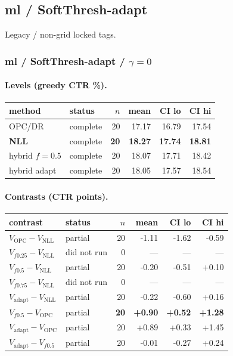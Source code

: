 \documentclass[10pt,a4paper]{article}
\begin{document}
\subsection{ml / SoftThresh-adapt}
Legacy / non-grid locked tags.
\subsubsection{ml / SoftThresh-adapt / $\gamma=0$}
\paragraph{Levels (greedy CTR \%).}
{\centering\small\begin{tabular}{llrrrr}
\toprule method & status & $n$ & mean & CI lo & CI hi \\
\midrule
OPC/DR & complete & 20 & 17.17 & 16.79 & 17.54 \\
\textbf{NLL} & complete & \textbf{20} & \textbf{18.27} & \textbf{17.74} & \textbf{18.81} \\
hybrid $f{=}0.5$ & complete & 20 & 18.07 & 17.71 & 18.42 \\
hybrid adapt & complete & 20 & 18.05 & 17.57 & 18.54 \\
\bottomrule\end{tabular}\par}
\paragraph{Contrasts (CTR points).}
{\centering\small\begin{tabular}{llrrrr}
\toprule contrast & status & $n$ & mean & CI lo & CI hi \\
\midrule
$V_{\mathrm{OPC}}-V_{\mathrm{NLL}}$ & partial & 20 & -1.11 & -1.62 & -0.59 \\
$V_{f0.25}-V_{\mathrm{NLL}}$ & did not run & 0 & --- & --- & --- \\
$V_{f0.5}-V_{\mathrm{NLL}}$ & partial & 20 & -0.20 & -0.51 & +0.10 \\
$V_{f0.75}-V_{\mathrm{NLL}}$ & did not run & 0 & --- & --- & --- \\
$V_{\mathrm{adapt}}-V_{\mathrm{NLL}}$ & partial & 20 & -0.22 & -0.60 & +0.16 \\
\textbf{$V_{f0.5}-V_{\mathrm{OPC}}$} & partial & \textbf{20} & \textbf{+0.90} & \textbf{+0.52} & \textbf{+1.28} \\
$V_{\mathrm{adapt}}-V_{\mathrm{OPC}}$ & partial & 20 & +0.89 & +0.33 & +1.45 \\
$V_{\mathrm{adapt}}-V_{f0.5}$ & partial & 20 & -0.01 & -0.27 & +0.24 \\
\bottomrule\end{tabular}\par}
\bigskip
\end{document}
